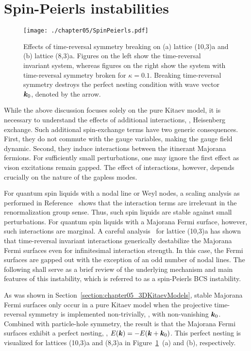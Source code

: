 %
%
\section{Spin-Peierls instabilities}
\label{section:chapter05_SpinPeierls}
%
%
%
\begin{figure}[tb]
	\centering
	\texttt{[image: ./chapter05/SpinPeierls.pdf]}
	\caption{
		Effects of time-reversal symmetry breaking on (a) lattice (10,3)a and (b) lattice (8,3)a.
		Figures on the left show the time-reversal invariant system, whereas figures on the right show the system with time-reversal symmetry broken for $\kappa = 0.1$.
		Breaking time-reversal symmetry destroys the perfect nesting condition with wave vector $\bm{k}_0$, denoted by the arrow.
	}
	\label{fig:chapter05_SpinPeierls}
\end{figure}
%
While the above discussion focuses solely on the pure Kitaev model, it is necessary to understand the effects of additional interactions, \eg, Heisenberg exchange.
Such additional spin-exchange terms have two generic consequences.
First, they do not commute with the gauge variables, making the gauge field dynamic.
Second, they induce interactions between the itinerant Majorana fermions.
For sufficiently small perturbations, one may ignore the first effect as vison excitations remain gapped.
The effect of interactions, however, depends crucially on the nature of the gapless modes.

For quantum spin liquids with a nodal line or Weyl nodes, a scaling analysis as performed in Reference~\cite{LeePRB2014} shows that the interaction terms are irrelevant in the renormalization group sense.
Thus, such spin liquids are stable against small perturbations.
For quantum spin liquids with a Majorana Fermi surface, however, such interactions are marginal.
A careful analysis~\cite{HermannsPRL2015b} for lattice (10,3)a has shown that time-reversal invariant interactions generically destabilize the Majorana Fermi surfaces even for infinitesimal interaction strength.
In this case, the Fermi surfaces are gapped out with the exception of an odd number of nodal lines.
The following shall serve as a brief review of the underlying mechanism and main features of this instability, which is referred to as a spin-Peierls BCS instability.

As was shown in Section~\ref{section:chapter05_3DKitaevModels}, stable Majorana Fermi surfaces only occur in a pure Kitaev model when the projective time-reversal symmetry is implemented non-trivially, \ie, with non-vanishing $\bm{k}_0$.
Combined with particle-hole symmetry, the result is that the Majorana Fermi surfaces exhibit a perfect nesting, \ie, $E(\bm{k}) = -E(\bm{k} + \bm{k}_0)$.
This perfect nesting is visualized for lattices (10,3)a and (8,3)a in Figure~\ref{fig:chapter05_SpinPeierls}~(a) and (b), respectively.

